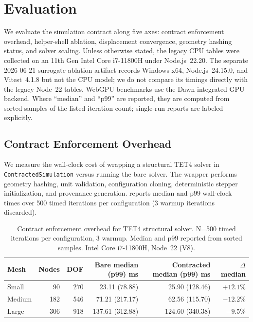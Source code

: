 \documentclass[journal]{IEEEtran}
\begin{document}
\section{Evaluation}
\label{sec:evaluation}

We evaluate the simulation contract along five axes: contract enforcement
overhead, helper-shell ablation, displacement convergence, geometry hashing
status, and solver scaling. Unless otherwise stated, the legacy CPU tables were
collected on an 11th Gen Intel Core i7-11800H under Node.js~22.20. The separate
2026-06-21 surrogate ablation artifact records Windows x64, Node.js~24.15.0, and
Vitest~4.1.8 but not the CPU model; we do not compare its timings directly with
the legacy Node~22 tables. WebGPU benchmarks use the Dawn integrated-GPU backend.
Where ``median'' and ``p99'' are reported, they are computed from sorted
samples of the listed iteration count; single-run reports are labeled
explicitly.

\subsection{Contract Enforcement Overhead}

We measure the wall-clock cost of wrapping a structural TET4 solver in
\texttt{ContractedSimulation} versus running the bare solver. The wrapper
performs geometry hashing, unit validation, configuration cloning,
deterministic stepper initialization, and provenance generation.
 reports median and p99 wall-clock times over 500
timed iterations per configuration (3 warmup iterations discarded).

\begin{table}[t]
  \centering
  \caption{Contract enforcement overhead for TET4 structural solver.
    N=500 timed iterations per configuration, 3 warmup. Median and p99
    reported from sorted samples. Intel Core i7-11800H, Node~22 (V8).}
  \label{tab:overhead}
  \begin{tabular}{@{}lrrrrr@{}}
    \toprule
    Mesh & Nodes & DOF & Bare median (p99) ms & Contracted median (p99) ms & $\Delta$ median \\
    \midrule
    Small  &  90 &  270 &  23.11 (78.88) &  25.90 (128.46) & $+12.1\%$ \\
    Medium & 182 &  546 &  71.21 (217.17) &  62.56 (115.70) & $-12.2\%$ \\
    Large  & 306 &  918 & 137.61 (312.88) & 124.60 (340.38) & $-9.5\%$ \\
    \bottomrule
  \end{tabular}
\end{table}
\end{document}
